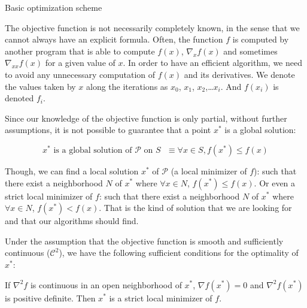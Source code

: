 \begin{algorithm}
\begin{algorithmic}
  \EndWhile{}
  \caption{Basic optimization scheme}
\label{alg:basic_optim}
\end{algorithmic}
\end{algorithm}

The objective function is not necessarily completely known, in the sense that we cannot always have an explicit formula. Often, the function $f$ is computed by another program that is able to compute $f(x)$, $\nabla_x f(x)$ and sometimes $\nabla_{xx} f(x)$ for a given value of $x$.
In order to have an efficient algorithm, we need to avoid any unnecessary computation of $f(x)$ and its derivatives.
We denote the values taken by $x$ along the iterations as $x_0$, $x_1$, $x_2$,\ldots $x_i$.
And $f(x_i)$ is denoted $f_i$.

Since our knowledge of the objective function is only partial, without further assumptions, it is not possible to guarantee that a point $x^*$ is a global solution:

\begin{equation}
  \text{$x^*$ is a global solution of $\mathcal{P}$ on $\mathit{S}$ } \equiv \forall x \in \mathit{S}, f(x^*) \leq f(x)
\end{equation}

Though, we can find a local solution $x^*$ of $\mathcal{P}$ (a local minimizer of $f$): such that there exist a neighborhood $\mathit{N}$ of $x^*$ where $\forall x\in \mathit{N}$, $f(x^*) \leq f(x)$.
Or even a strict local minimizer of $f$: such that there exist a neighborhood $\mathit{N}$ of $x^*$ where $\forall x\in \mathit{N}$, $f(x^*) < f(x)$.
That is the kind of solution that we are looking for and that our algorithms should find.

Under the assumption that the objective function is smooth and sufficiently continuous ($\mathcal{C}^2$), we have the following sufficient conditions for the optimality of $x^*$:

\begin{theorem}
  If $\nabla^2f$ is continuous in an open neighborhood of $x^*$, $\nabla f(x^*)=0$ and $\nabla^2 f(x^*)$ is positive definite.
  Then $x^*$ is a strict local minimizer of $f$.
\label{optimalityTheorem}
\end{theorem}

